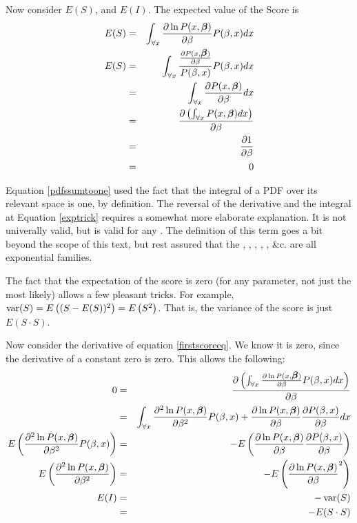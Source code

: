 Now consider $E(S)$, and $E(I)$. The expected value of the Score is 
\begin{eqnarray}
E(S) &=& \int_{\forall x} {\partial \ln P(x,{\mbox{\boldmath$\beta$}})\over\partial\beta}
 P(\beta,x) dx \label{firstscoreeq}\\
E(S) &=& \int_{\forall x} {{\partial P(x,{\mbox{\boldmath$\beta$}})\over\partial\beta}\over
P(\beta,x)} P(\beta,x) dx \nonumber\\
    &=& \int_{\forall x} {{\partial P(x,{\mbox{\boldmath$\beta$}})\over\partial\beta} dx}\nonumber\\
    &=& {\partial \left(\int_{\forall x} P(x,{\mbox{\boldmath$\beta$}}) dx\right)\over \partial \beta}\label{exptrick}\\
    &=& {\partial 1 \over \partial \beta} \label{pdfssumtoone}\\
    &=& 0 \nonumber
\end{eqnarray}

Equation \ref{pdfssumtoone} used the fact that the integral of a PDF
over its relevant space is one, by definition.
The reversal of the
derivative and the integral at Equation \ref{exptrick} requires a
somewhat more elaborate explanation. It is not univerally valid,
but is valid for any . The definition of this
term goes a bit beyond the scope of this text, but rest assured that the
, , , , ,
\&c. are all exponential families.

The fact that the expectation of the score is zero (for any parameter,
not just the most likely) allows a few pleasant tricks. For example,
$\operatorname{var}(S)= E\left((S - E(S))^2\right) = E\left(S^2\right)$. That is, the
variance of the score is just $E(S\cdot S)$.

Now consider the derivative of equation \ref{firstscoreeq}. We know it
is zero, since the derivative of a constant zero is zero. This allows
the following:
\begin{eqnarray}
0 &=& {\partial \left(\int_{\forall x} {\partial \ln P(x,{\mbox{\boldmath$\beta$}})\over\partial\beta} P(\beta,x) dx\right)\over \partial \beta} \nonumber\\
 &=& \int_{\forall x} {\partial^2 \ln P(x,{\mbox{\boldmath$\beta$}})\over\partial\beta^2} P(\beta,x) +  {\partial \ln P(x,{\mbox{\boldmath$\beta$}})\over\partial\beta} {\partial P(\beta,x)\over \partial \beta} dx \nonumber\\
 E\left( {\partial^2 \ln P(x,{\mbox{\boldmath$\beta$}})\over\partial\beta^2} P(\beta,x)\right) &=& - E\left({\partial \ln P(x,{\mbox{\boldmath$\beta$}})\over\partial\beta} {\partial P(\beta,x)\over \partial \beta}\right) \nonumber\\
 E\left( {\partial^2 \ln P(x,{\mbox{\boldmath$\beta$}})\over\partial\beta^2}\right) &=& - E\left({\partial \ln P(x,{\mbox{\boldmath$\beta$}})\over\partial\beta}^2\right) \nonumber\\
E(I) &=& -\operatorname{var}(S)   \label{moneyone}\\
 &=& -E(S\cdot S)      \label{moneytwo}
\end{eqnarray}

